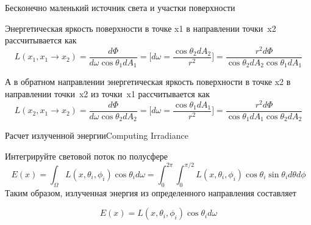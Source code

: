\documentclass{beamer}
\begin{document}
	\begin{frame}{Бесконечно маленький источник света и участки поверхности}

		Энергетическая яркость поверхности в точке x1 в направлении точки~x2 рассчитывается как
		\[
			L(x_1,x_1 \to x_2) = 
			\frac{d \Phi}{d \omega \cos \theta_1 d A_1}
			=
			\biggl[ 
				d \omega = \frac{\cos \theta_2 d A_2 }{ r^2}
			\biggr]
			=
			\frac{r^2 d \Phi}{\cos \theta_2 d A_2   \cos \theta_1 d A_1}
		\]

		А в обратном направлении энергетическая яркость поверхности в точке x2 в направлении точки~x2 из точки~x1 рассчитывается как
		\[
			L(x_2,x_1 \to x_2) = 
			\frac{d \Phi}{d \omega \cos \theta_2 d A_2}
			=
			\biggl[ 
				d \omega = \frac{\cos \theta_1 d A_1 }{ r^2}
			\biggr]
			=
			\frac{r^2 d \Phi}{\cos \theta_1 d A_1 \cos \theta_2 d A_2}
		\]

	\end{frame}

	\begin{frame}{Расчет излученной энергии}{Computing Irradiance}
		
	Интегрируйте световой поток по полусфере
		\[
			E(x) = \int_{\Omega} L(x, \theta_i, \phi_i) \cos \theta_i d \omega
			=
			\int_{0}^{2\pi}\int_{0}^{\pi / 2} 
			L(x, \theta_i, \phi_i) 
			\cos \theta_i \sin \theta_i d \theta d \phi
		\]
	Таким образом, излученная энергия из определенного направления составляет

	\[
		E(x) = L(x, \theta_i, \phi_i) \cos \theta_i d \omega
	\]

	\end{frame}
\end{document}
